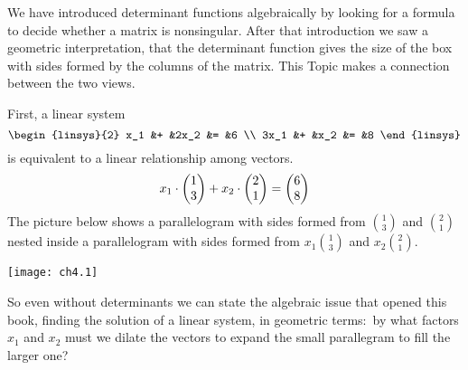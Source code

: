 We have introduced determinant functions algebraically by looking
for a formula to decide whether a matrix is nonsingular.
After that introduction we saw a geometric interpretation, 
that the determinant function
gives the size of the box with sides formed by the columns of the matrix.
This Topic makes a connection between the two views.

First, a linear system
\begin{equation*}
  \begin{linsys}{2}
     x_1  &+  &2x_2  &=  &6  \\
    3x_1  &+  &x_2   &=  &8 
  \end{linsys}
\end{equation*}
is equivalent to a linear relationship among vectors. 
\begin{equation*}
  x_1\cdot\begin{pmatrix} 1 \\ 3 \end{pmatrix}+x_2\cdot\begin{pmatrix} 2 \\ 1 \end{pmatrix}=\begin{pmatrix} 6 \\ 8 \end{pmatrix}
\end{equation*}
The picture below shows a parallelogram with sides formed from
$\binom{1}{3}$ and $\binom{2}{1}$ nested inside a parallelogram 
with sides formed from $x_1\binom{1}{3}$ and $x_2\binom{2}{1}$.
\begin{center}
  \texttt{[image: ch4.1]}
\end{center}
So even without determinants
we can state the algebraic issue that opened this book,
finding the solution of a linear system,
in geometric terms:~by 
what factors $x_1$ and $x_2$ must we dilate the vectors to expand the small 
parallegram to fill the larger one?

